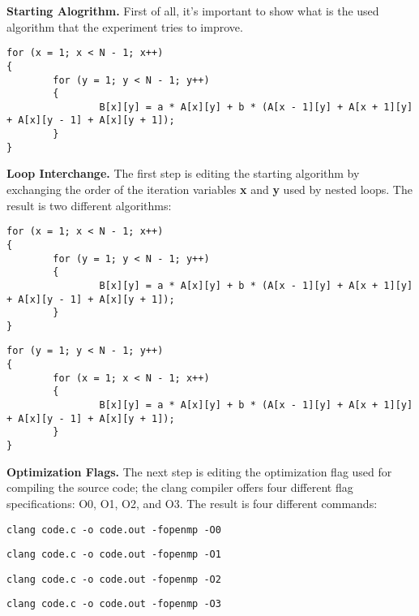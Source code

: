 \documentclass[conference]{IEEEtran}
\newcommand{\mypar}[1]{{\bf #1.}}
\begin{document}
\mypar{Starting Alogrithm}
First of all, it's important to show what is the used algorithm that the experiment tries to improve.
\begin{lstlisting}
for (x = 1; x < N - 1; x++)
{
		for (y = 1; y < N - 1; y++)
		{
				B[x][y] = a * A[x][y] + b * (A[x - 1][y] + A[x + 1][y] + A[x][y - 1] + A[x][y + 1]);
		}
}
\end{lstlisting}

\mypar{Loop Interchange}
The first step is editing the starting algorithm by exchanging the order of the iteration variables \textbf{x} and \textbf{y} used by nested loops. The result is two different algorithms:

\setcounter{lstlisting}{0}
\renewcommand{\lstlistingname}{Algorithm}

\begin{lstlisting}[caption=The starting algorithm]
for (x = 1; x < N - 1; x++)
{
		for (y = 1; y < N - 1; y++)
		{
				B[x][y] = a * A[x][y] + b * (A[x - 1][y] + A[x + 1][y] + A[x][y - 1] + A[x][y + 1]);
		}
}
\end{lstlisting}

\begin{lstlisting}[caption=A new algorithm with x and y exchanged]
for (y = 1; y < N - 1; y++)
{
		for (x = 1; x < N - 1; x++)
		{
				B[x][y] = a * A[x][y] + b * (A[x - 1][y] + A[x + 1][y] + A[x][y - 1] + A[x][y + 1]);
		}
}
\end{lstlisting}

\mypar{Optimization Flags}
The next step is editing the optimization flag used for compiling the source code; the clang compiler offers four different flag specifications: O0, O1, O2, and O3. The result is four different commands:

\setcounter{lstlisting}{0}
\renewcommand{\lstlistingname}{Command}

\begin{lstlisting}[caption=Flag -O0]
clang code.c -o code.out -fopenmp -O0
\end{lstlisting}

\begin{lstlisting}[caption=Flag -O1]
clang code.c -o code.out -fopenmp -O1
\end{lstlisting}

\begin{lstlisting}[caption=Flag -O2]
clang code.c -o code.out -fopenmp -O2
\end{lstlisting}

\begin{lstlisting}[caption=Flag -O3]
clang code.c -o code.out -fopenmp -O3
\end{lstlisting}
\end{document}
